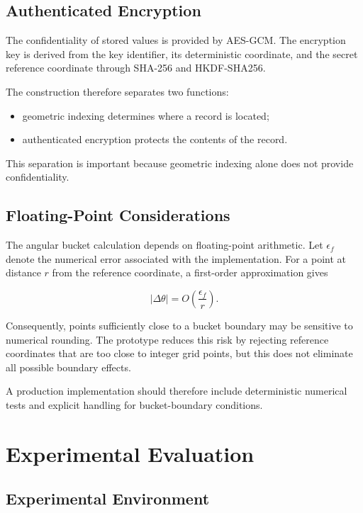 \documentclass[journal,twocolumn]{IEEEtran}
\begin{document}
\subsection{Authenticated Encryption}

The confidentiality of stored values is provided by AES-GCM. The encryption key is derived from the key identifier, its deterministic coordinate, and the secret reference coordinate through SHA-256 and HKDF-SHA256.

The construction therefore separates two functions:

\begin{itemize}
    \item geometric indexing determines where a record is located;
    \item authenticated encryption protects the contents of the record.
\end{itemize}

This separation is important because geometric indexing alone does not provide confidentiality.

\subsection{Floating-Point Considerations}

The angular bucket calculation depends on floating-point arithmetic. Let $\epsilon_f$ denote the numerical error associated with the implementation. For a point at distance $r$ from the reference coordinate, a first-order approximation gives

\begin{equation}
|\Delta\theta|=O\left(\frac{\epsilon_f}{r}\right).
\end{equation}

Consequently, points sufficiently close to a bucket boundary may be sensitive to numerical rounding. The prototype reduces this risk by rejecting reference coordinates that are too close to integer grid points, but this does not eliminate all possible boundary effects.

A production implementation should therefore include deterministic numerical tests and explicit handling for bucket-boundary conditions.

\section{Experimental Evaluation}

\subsection{Experimental Environment}
\end{document}
